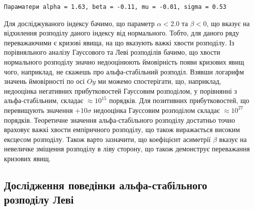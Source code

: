 \documentclass[
  letterpaper,
]{report}
\begin{document}
\begin{verbatim}
Параматери alpha = 1.63, beta = -0.11, mu = -0.01, sigma = 0.53
\end{verbatim}

Для досліджуваного індексу бачимо, що параметр \(\alpha < 2.0\) та
\(\beta < 0\), що вказує на відхилення розподілу даного індексу від
нормального. Тобто, для даного ряду переважаючими є кризові явища, на що
вказують важкі хвости розподілу. Із порівняльного аналізу Гауссового та
Леві розподілів бачимо, що хвости нормального розподілу значно
недооцінюють ймовірність появи кризових явищ чого, наприклад, не скажешь
про альфа-стабільний розподіл. Взявши логарифм значень ймовірності по
осі \(Oy\) ми можемо спостерігати, що, наприклад, недооцінка негативних
прибутковостей Гауссовим розподілом, у порівнянні з альфа-стабільним,
складає \(\approx 10^{15}\) порядків. Для позитивних прибутковостей, що
перевищують значення \(+10\sigma\) недооцінка Гауссовим розподілом
складає \(\approx 10^{27}\) порядків. Теоретичне значення
альфа-стабільного розподілу достатньо точно враховує важкі хвости
емпіричного розподілу, що також виражається високим ексцесом розподілу.
Також варто зазначити, що коефіцієнт асиметрії \(\beta\) вказує на
невеличке зміщення розподілу в ліву сторону, що також демонструє
переважання кризових явищ.

\hypertarget{ux434ux43eux441ux43bux456ux434ux436ux435ux43dux43dux44f-ux43fux43eux432ux435ux434ux456ux43dux43aux438-ux430ux43bux44cux444ux430-ux441ux442ux430ux431ux456ux43bux44cux43dux43eux433ux43e-ux440ux43eux437ux43fux43eux434ux456ux43bux443-ux43bux435ux432ux456}{%
\subsection{Дослідження поведінки альфа-стабільного розподілу
Леві}\label{ux434ux43eux441ux43bux456ux434ux436ux435ux43dux43dux44f-ux43fux43eux432ux435ux434ux456ux43dux43aux438-ux430ux43bux44cux444ux430-ux441ux442ux430ux431ux456ux43bux44cux43dux43eux433ux43e-ux440ux43eux437ux43fux43eux434ux456ux43bux443-ux43bux435ux432ux456}}
\end{document}
